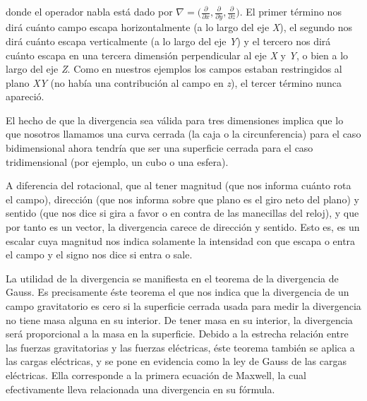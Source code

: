 \documentclass{article}
\begin{document}
donde el operador nabla está dado por $\nabla=\bigg(\frac{\partial}{\partial x},\frac{\partial}{\partial y},\frac{\partial}{\partial z}\bigg)$. El primer término nos dirá cuánto campo escapa horizontalmente (a lo largo del eje \emph{X}), el segundo nos dirá cuánto escapa verticalmente (a lo largo del eje \emph{Y}) y el tercero nos dirá cuánto escapa en una tercera dimensión perpendicular al eje \emph{X} y \emph{Y}, o bien a lo largo del eje \emph{Z}. Como en nuestros ejemplos los campos estaban restringidos al plano \emph{XY} (no había una contribución al campo en \emph{z}), el tercer término nunca apareció.\bigskip

El hecho de que la divergencia sea válida para tres dimensiones implica que lo que nosotros llamamos una curva cerrada (la caja o la circunferencia) para el caso bidimensional ahora tendría que ser una superficie cerrada para el caso tridimensional (por ejemplo, un cubo o una esfera).\bigskip

A diferencia del rotacional, que al tener magnitud (que nos informa cuánto rota el campo), dirección (que nos informa sobre que plano es el giro neto del plano) y sentido (que nos dice si gira a favor o en contra de las manecillas del reloj), y que por tanto es un vector, la divergencia carece de dirección y sentido. Esto es, es un escalar cuya magnitud nos indica solamente la intensidad con que escapa o entra el campo y el signo nos dice si entra o sale.\bigskip

La utilidad de la divergencia se manifiesta en el teorema de la divergencia de Gauss. Es precisamente éste teorema el que nos indica que la divergencia de un campo gravitatorio es cero si la superficie cerrada usada para medir la divergencia no tiene masa alguna en su interior. De tener masa en su interior, la divergencia será proporcional a la masa en la superficie. Debido a la estrecha relación entre las fuerzas gravitatorias y las fuerzas eléctricas, éste teorema también se aplica a las cargas eléctricas, y se pone en evidencia como la ley de Gauss de las cargas eléctricas. Ella corresponde a la primera ecuación de Maxwell, la cual efectivamente lleva relacionada una divergencia en su fórmula.
\end{document}
